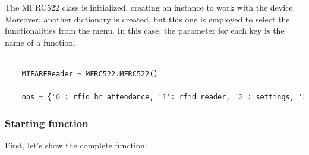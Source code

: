 \documentclass[12pt,a4paper,oneside]{article} %
\begin{document}
The MFRC522 class is initialized, creating an instance to work with the device. Moreover, another dictionary is created, but this one is employed to select the functionalities from the menu. In this case, the parameter for each key is the name of a function.

\begin{lstlisting}[language=python]

	MIFAREReader = MFRC522.MFRC522()
	
	ops = {'0': rfid_hr_attendance, '1': rfid_reader, '2': settings, '3': back, '4': reset_settings, '5': change_language}

\end{lstlisting}

\subsubsection*{Starting function}

First, let's show the complete function:
\end{document}

